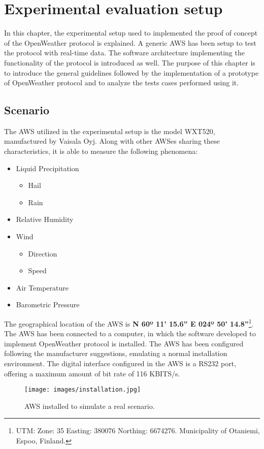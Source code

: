 
\chapter{Experimental evaluation setup}

In this  chapter, the experimental setup used to implemented the proof of concept of the OpenWeather protocol is explained. A generic \gls{AWS} has been setup to test the protocol with real-time data. The software architecture implementing the functionality of the protocol is introduced as well.
The purpose of this chapter is to introduce the general guidelines followed by the implementation of a prototype of OpenWeather protocol and to analyze the tests cases performed using it.

\section{Scenario}
The \gls{AWS} utilized in the experimental setup is the model WXT520, manufactured by Vaisala Oyj. Along with other \gls{AWS}es sharing these characteristics, it is able to measure the following phenomena:

\begin{itemize}
\item Liquid Precipitation
	\begin{itemize}
	\item Hail
	\item Rain
	\end{itemize}
\item Relative Humidity
\item Wind
	\begin{itemize}
	\item Direction
	\item Speed
	\end{itemize}
\item Air Temperature
\item Barometric Pressure
\end{itemize}

The geographical location of the \gls{AWS} is \textbf{N 60º 11' 15.6'' E 024º 50' 14.8''}\footnote{\gls{UTM}: Zone: 35
Easting: 380076 Northing: 6674276. Municipality of Otaniemi, Espoo, Finland.}. The \gls{AWS} has been connected to a computer, in which the software developed to implement OpenWeather protocol is installed. The \gls{AWS} has been configured following the manufacturer suggestions, emulating a normal installation environment. The digital interface configured in the \gls{AWS} is a  \gls{RS232} port, offering a maximum amount of bit rate of 116 \gls{KBITS}/s.
\begin{figure}[H]
\centerline{\texttt{[image: images/installation.jpg]}}
\caption{\protect \gls{AWS} installed to simulate a real scenario.}
\end{figure}

